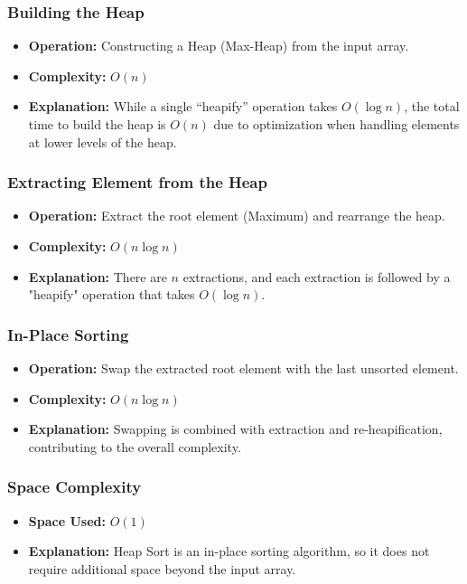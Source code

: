 \subsubsection{Building the Heap}
\begin{itemize}
    \item \textbf{Operation:} Constructing a Heap (Max-Heap) from the input array.
    \item \textbf{Complexity:} $O(n)$
    \item \textbf{Explanation:} While a single “heapify” operation takes $O(\log n)$, the total time to build the heap is $O(n)$ due to optimization when handling elements at lower levels of the heap.
\end{itemize}

\subsubsection{Extracting Element from the Heap}
\begin{itemize}
    \item \textbf{Operation:} Extract the root element (Maximum) and rearrange the heap.
    \item \textbf{Complexity:} $O(n \log n)$
    \item \textbf{Explanation:} There are $n$ extractions, and each extraction is followed by a "heapify" operation that takes $O(\log n)$.
\end{itemize}

\subsubsection{In-Place Sorting}
\begin{itemize}
    \item \textbf{Operation:} Swap the extracted root element with the last unsorted element.
    \item \textbf{Complexity:} $O(n \log n)$
    \item \textbf{Explanation:} Swapping is combined with extraction and re-heapification, contributing to the overall complexity.
\end{itemize}

\subsubsection{Space Complexity}
\begin{itemize}
    \item \textbf{Space Used:} $O(1)$
    \item \textbf{Explanation:} Heap Sort is an in-place sorting algorithm, so it does not require additional space beyond the input array.
\end{itemize}

